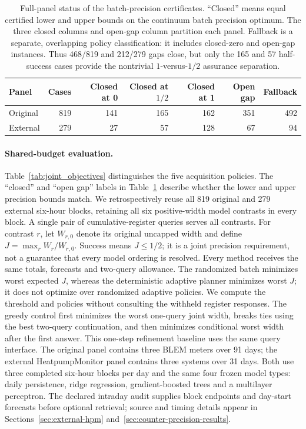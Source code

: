 \documentclass[12pt]{article}
\begin{document}
\begin{table}[htbp]
\centering\small
\begin{tabular}{lrrrrrr}
\toprule
Panel & Cases & Closed at 0 & Closed at $1/2$ & Closed at 1 & Open gap & Fallback\\
\midrule
Original & 819 & 141 & 165 & 162 & 351 & 492\\
External & 279 & 27 & 57 & 128 & 67 & 94\\
\bottomrule
\end{tabular}
\caption{Full-panel status of the batch-precision certificates. ``Closed'' means equal certified lower and upper bounds on the continuum batch precision optimum. The three closed columns and open-gap column partition each panel. Fallback is a separate, overlapping policy classification: it includes closed-zero and open-gap instances. Thus 468/819 and 212/279 gaps close, but only the 165 and 57 half-success cases provide the nontrivial $1$-versus-$1/2$ assurance separation.}
\label{tab:joint_precision_status}
\end{table}
\paragraph{Shared-budget evaluation.}
Table~\ref{tab:joint_objectives} distinguishes the five acquisition policies.
The ``closed'' and ``open gap'' labels in Table~\ref{tab:joint_precision_status}
describe whether the lower and upper precision bounds match.
We retrospectively reuse all 819 original and 279 external six-hour blocks,
retaining all six positive-width model contrasts in every block. A single pair
of cumulative-register queries serves all contrasts. For contrast $r$, let
$W_{r,0}$ denote its original uncapped width and define
$J=\max_r W_r/W_{r,0}$. Success means $J\leq1/2$; it is a joint precision
requirement, not a guarantee that every model ordering is resolved. Every
method receives the same totals, forecasts and two-query allowance. The
randomized batch minimizes worst expected $J$, whereas the deterministic
adaptive planner minimizes worst $J$; it does not optimize over randomized
adaptive policies. We compute the threshold and policies without consulting
the withheld register responses.
The greedy control first minimizes the worst one-query joint width, breaks
ties using the best two-query continuation, and then minimizes conditional
worst width after the first answer. This one-step refinement baseline uses
the same query interface.
The original panel contains three BLEM meters over 91 days; the external
HeatpumpMonitor panel contains three systems over 31 days. Both use three
completed six-hour blocks per day and the same four frozen model types:
daily persistence, ridge regression, gradient-boosted trees and a multilayer
perceptron. The declared intraday audit supplies block endpoints and day-start
forecasts before optional retrieval; source and timing details appear in
Sections~\ref{sec:external-hpm} and~\ref{sec:counter-precision-results}.
\end{document}
